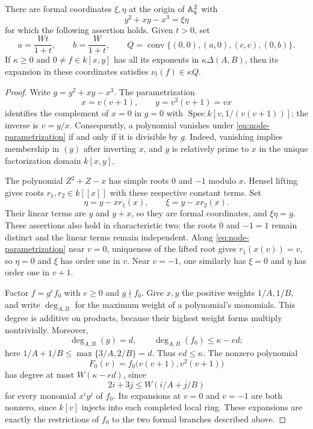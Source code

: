 \begin{lemma}\label{lem:nodal-bound}
There are formal coordinates $\xi,\eta$ at the origin of $\mathbb A^2_k$ with
\[
 y^2+xy-x^3=\xi\eta
\]
for which the following assertion holds.  Given $t>0$, set
\[
 a=\frac{Wt}{1+t},\qquad b=\frac{W}{1+t},\qquad
 Q=\operatorname{conv}\{(0,0),(a,0),(c,c),(0,b)\}.
\]
If $\kappa\ge0$ and $0\ne f\in k[x,y]$ has all its exponents in
$\kappa\Delta(A,B)$, then its expansion in these coordinates satisfies
$\nu_t(f)\in\kappa Q$.
\end{lemma}

\begin{proof}
Write $g=y^2+xy-x^3$.  The parametrization
\begin{equation}\label{eq:node-parametrization}
 x=v(v+1),\qquad y=v^2(v+1)=vx
\end{equation}
identifies the complement of $x=0$ in $g=0$ with
$\operatorname{Spec}k[v,1/(v(v+1))]$: the inverse is $v=y/x$.
Consequently, a polynomial vanishes under \eqref{eq:node-parametrization}
if and only if it is divisible by $g$.  Indeed, vanishing implies
membership in $(g)$ after inverting $x$, and $g$ is relatively prime to
$x$ in the unique factorization domain $k[x,y]$.

The polynomial $Z^2+Z-x$ has simple roots $0$ and $-1$ modulo $x$.
Hensel lifting gives roots $r_1,r_2\in k[[x]]$ with these respective
constant terms.  Set
\[
 \eta=y-xr_1(x),\qquad \xi=y-xr_2(x).
\]
Their linear terms are $y$ and $y+x$, so they are formal coordinates, and
$\xi\eta=g$.  These assertions also hold in characteristic two: the roots
$0$ and $-1=1$ remain distinct and the linear terms remain independent.
Along \eqref{eq:node-parametrization} near $v=0$, uniqueness of the lifted
root gives $r_1(x(v))=v$, so $\eta=0$ and $\xi$ has order one in $v$.
Near $v=-1$, one similarly has $\xi=0$ and $\eta$ has order one in $v+1$.

Factor $f=g^e f_0$ with $e\ge0$ and $g\nmid f_0$.  Give $x,y$ the
positive weights $1/A,1/B$, and write $\deg_{A,B}$ for the maximum weight
of a polynomial's monomials.  This degree is additive on products,
because their highest weight forms multiply nontrivially.  Moreover,
\[
 \deg_{A,B}(g)=d,
 \qquad \deg_{A,B}(f_0)\le\kappa-ed;
\]
here $1/A+1/B\le\max\{3/A,2/B\}=d$.  Thus $ed\le\kappa$.
The nonzero polynomial
\[
 F_0(v)=f_0\bigl(v(v+1),v^2(v+1)\bigr)
\]
has degree at most $W(\kappa-ed)$, since
\[
 2i+3j\le W(i/A+j/B)
\]
for every monomial $x^iy^j$ of $f_0$.  Its expansions at $v=0$ and
$v=-1$ are both nonzero, since $k[v]$ injects into each completed local
ring.  These expansions are exactly the restrictions of $f_0$ to the
two formal branches described above.


\end{proof}
